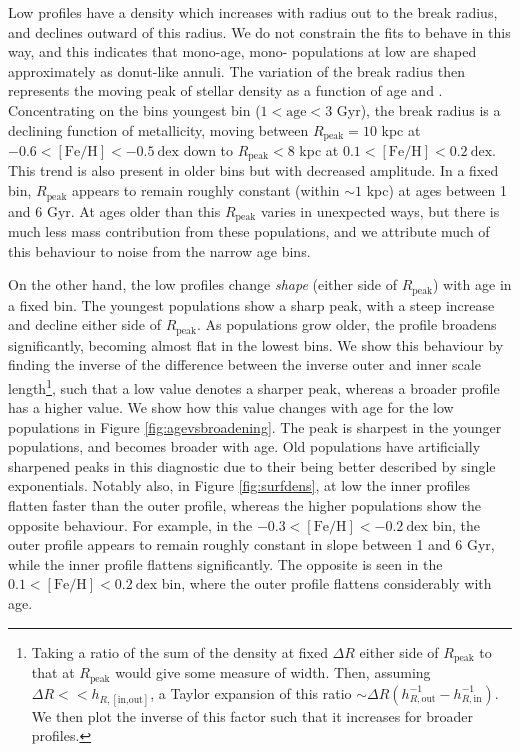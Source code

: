Low \afe{} profiles have a density which increases with radius out to the break radius, and declines outward of this radius. We do not constrain the fits to behave in this way, and this indicates that mono-age, mono-\feh{} populations at low \feh{} are shaped approximately as donut-like annuli. The variation of the break radius then represents the moving peak of stellar density as a function of age and \feh{}. Concentrating on the bins youngest bin ($1 < \mathrm{age} < 3$ Gyr), the break radius is a declining function of metallicity, moving between $R_{\mathrm{peak}}=10$ kpc at $-0.6 < \mathrm{[Fe/H]} < -0.5\ \mathrm{dex}$ down to $R_{\mathrm{peak}} < 8$ kpc at $0.1 < \mathrm{[Fe/H]} < 0.2\ \mathrm{dex}$. This trend is also present in older bins but with decreased amplitude. In a fixed \feh{} bin, $R_{\mathrm{peak}}$ appears to remain roughly constant (within $\sim1$ kpc) at ages between 1 and 6 Gyr.  At ages older than this $R_{\mathrm{peak}}$ varies in unexpected ways, but there is much less mass contribution from these populations, and we attribute much of this behaviour to noise from the narrow age bins. 

On the other hand, the low \afe{} profiles change \emph{shape} (either side of $R_{\mathrm{peak}}$) with age in a fixed \feh{} bin. The youngest populations show a sharp peak, with a steep increase and decline either side of $R_{\mathrm{peak}}$. As populations grow older, the profile broadens significantly, becoming almost flat in the lowest \feh{} bins. We show this behaviour by finding the inverse of the difference between the inverse outer and inner scale length\footnote{Taking a ratio of the sum of the density at fixed $\Delta R$ either side of $R_{\mathrm{peak}}$ to that at $R_{\mathrm{peak}}$ would give some measure of width. Then, assuming $\Delta R << h_{R,[\text{in,out}]}$, a Taylor expansion of this ratio $\sim \Delta R (h_{R,\text{out}}^{-1}-h_{R,\text{in}}^{-1})$. We then plot the inverse of this factor such that it increases for broader profiles.}, such that a low value denotes a sharper peak, whereas a broader profile has a higher value. We show how this value changes with age for the low \afe{} populations in Figure \ref{fig:agevsbroadening}. The peak is sharpest in the younger populations, and becomes broader with age. Old populations have artificially sharpened peaks in this diagnostic due to their being better described by single exponentials. Notably also, in Figure \ref{fig:surfdens}, at low \feh{} the inner profiles flatten faster than the outer profile, whereas the higher \feh{} populations show the opposite behaviour. For example, in the $-0.3 < \mathrm{[Fe/H]} < -0.2\ \mathrm{dex}$ bin, the outer profile appears to remain roughly constant in slope between 1 and 6 Gyr, while the inner profile flattens significantly. The opposite is seen in the $0.1 < \mathrm{[Fe/H]} < 0.2\ \mathrm{dex}$ bin, where the outer profile flattens considerably with age. 

